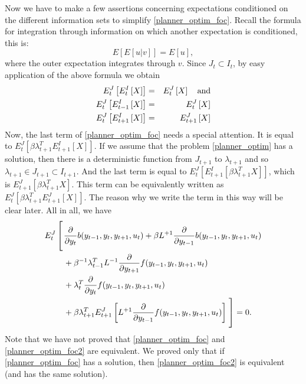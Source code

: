 \documentclass[10pt]{article}
\begin{document}
Now we have to make a few assertions concerning expectations
conditioned on the different information sets to simplify
\eqref{planner_optim_foc}. Recall the formula for integration through
information on which another expectation is conditioned, this is:
$$E\left[E\left[u|v\right]\right] = E[u],$$
where the outer expectation integrates through $v$. Since $J_t\subset
I_t$, by easy application of the above formula we obtain
\begin{eqnarray}
E^J_t\left[E^I_t\left[X\right]\right] &=& E^J_t\left[X\right]\quad\rm{and}\notag\\
E^J_t\left[E^I_{t-1}\left[X\right]\right] &=& E^J_t\left[X\right]\label{e_iden}\\
E^J_t\left[E^I_{t+1}\left[X\right]\right] &=& E^J_{t+1}\left[X\right]\notag
\end{eqnarray}
Now, the last term of \eqref{planner_optim_foc} needs a special
attention. It is equal to
$E^J_t\left[\beta\lambda^T_{t+1}E^I_{t+1}[X]\right]$. If we assume
that the problem \eqref{planner_optim} has a solution, then there is a
deterministic function from $J_{t+1}$ to $\lambda_{t+1}$ and so
$\lambda_{t+1}\in J_{t+1}\subset I_{t+1}$. And the last term is equal
to $E^J_{t}\left[E^I_{t+1}[\beta\lambda^T_{t+1}X]\right]$, which is
$E^J_{t+1}\left[\beta\lambda^T_{t+1}X\right]$. This term can be
equivalently written as
$E^J_{t}\left[\beta\lambda^T_{t+1}E^J_{t+1}[X]\right]$. The reason why
we write the term in this way will be clear later. All in all, we have
\begin{align}
E^J_t\left[\vphantom{\frac{\int^(_)}{\int^(\_)}}\right.&\frac{\partial}{\partial y_t}b(y_{t-1},y_t,y_{t+1},u_t)+
\beta L^{+1}\frac{\partial}{\partial y_{t-1}}b(y_{t-1},y_t,y_{t+1},u_t)\notag\\
&+\beta^{-1}\lambda_{t-1}^TL^{-1}\frac{\partial}{\partial y_{t+1}}f(y_{t-1},y_t,y_{t+1},u_t)\notag\\
&+\lambda_t^T\frac{\partial}{\partial y_{t}}f(y_{t-1},y_t,y_{t+1},u_t)\notag\\
&+\beta\lambda_{t+1}^TE^J_{t+1}\left[L^{+1}\frac{\partial}{\partial y_{t-1}}f(y_{t-1},y_t,y_{t+1},u_t)\right]
\left.\vphantom{\frac{\int^(_)}{\int^(\_)}}\right]
 = 0.\label{planner_optim_foc2}
\end{align}
Note that we have not proved that \eqref{planner_optim_foc} and
\eqref{planner_optim_foc2} are equivalent. We proved only that if
\eqref{planner_optim_foc} has a solution, then
\eqref{planner_optim_foc2} is equivalent (and has the same solution).

\end{document}
